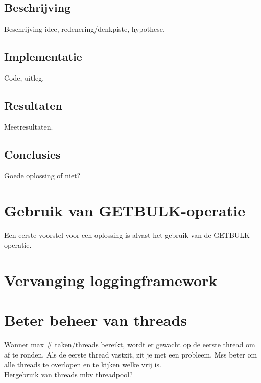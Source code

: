 \subsection{Beschrijving}
Beschrijving idee, redenering/denkpiste, hypothese.

\subsection{Implementatie}
Code, uitleg.

\subsection{Resultaten}
Meetresultaten.

\subsection{Conclusies}
Goede oplossing of niet?


\section[GETBULK-operatie]{Gebruik van GETBULK-operatie}
Een eerste voorstel voor een oplossing is alvast het gebruik van de GETBULK-operatie.


\section{Vervanging loggingframework}
\label{vervanging-loggingframework}



\section{Beter beheer van threads}
Wanner max \# taken/threads bereikt, wordt er gewacht op de eerste thread om af te ronden.
Als de eerste thread vastzit, zit je met een probleem. Mss beter om alle threads te overlopen en te kijken welke vrij is. \\
Hergebruik van threads mbv threadpool?

